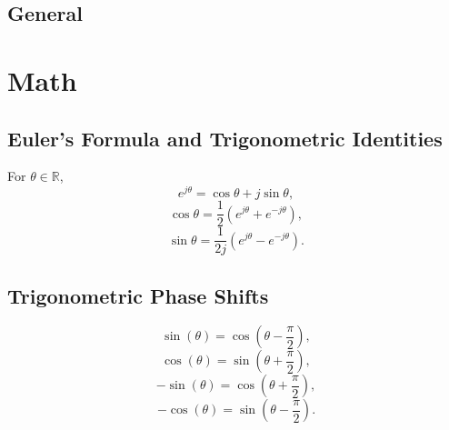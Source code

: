 \documentclass{article}
\begin{document}
\begin{center}
    \section*{General}
\end{center}

\section{Math}
\subsection{Euler's Formula and Trigonometric Identities}
\begin{definition}
    For \( \theta \in \mathbb{R} \),
    \begin{equation*}
        e^{j\theta} = \cos \theta + j \sin \theta,
    \end{equation*}
    \begin{equation*}
        \cos \theta = \frac{1}{2}\left(e^{j\theta} + e^{-j\theta}\right),
    \end{equation*}
    \begin{equation*}
        \sin \theta = \frac{1}{2j}\left(e^{j\theta} - e^{-j\theta}\right).
    \end{equation*}
\end{definition}

\subsection{Trigonometric Phase Shifts}
\begin{definition}
    \begin{equation*}
        \sin(\theta) = \cos\left(\theta - \frac{\pi}{2}\right),
    \end{equation*}
    \begin{equation*}
        \cos(\theta) = \sin\left(\theta + \frac{\pi}{2}\right),
    \end{equation*}
    \begin{equation*}
        -\sin(\theta) = \cos\left(\theta + \frac{\pi}{2}\right),
    \end{equation*}
    \begin{equation*}
        -\cos(\theta) = \sin\left(\theta - \frac{\pi}{2}\right).
    \end{equation*}
\end{definition}
\end{document}
